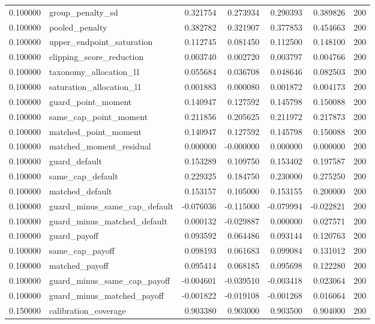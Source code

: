 \begin{tabular}{rlrrrrr}
0.100000 & group\_penalty\_sd & 0.321754 & 0.273934 & 0.290393 & 0.389826 & 200 \\
0.100000 & pooled\_penalty & 0.382782 & 0.321907 & 0.377853 & 0.454663 & 200 \\
0.100000 & upper\_endpoint\_saturation & 0.112745 & 0.081450 & 0.112500 & 0.148100 & 200 \\
0.100000 & clipping\_score\_reduction & 0.003740 & 0.002720 & 0.003797 & 0.004766 & 200 \\
0.100000 & taxonomy\_allocation\_l1 & 0.055684 & 0.036708 & 0.048646 & 0.082503 & 200 \\
0.100000 & saturation\_allocation\_l1 & 0.001883 & 0.000080 & 0.001872 & 0.004173 & 200 \\
0.100000 & guard\_point\_moment & 0.140947 & 0.127592 & 0.145798 & 0.150088 & 200 \\
0.100000 & same\_cap\_point\_moment & 0.211856 & 0.205625 & 0.211972 & 0.217873 & 200 \\
0.100000 & matched\_point\_moment & 0.140947 & 0.127592 & 0.145798 & 0.150088 & 200 \\
0.100000 & matched\_moment\_residual & 0.000000 & -0.000000 & 0.000000 & 0.000000 & 200 \\
0.100000 & guard\_default & 0.153289 & 0.109750 & 0.153402 & 0.197587 & 200 \\
0.100000 & same\_cap\_default & 0.229325 & 0.184750 & 0.230000 & 0.275250 & 200 \\
0.100000 & matched\_default & 0.153157 & 0.105000 & 0.153155 & 0.200000 & 200 \\
0.100000 & guard\_minus\_same\_cap\_default & -0.076036 & -0.115000 & -0.079994 & -0.022821 & 200 \\
0.100000 & guard\_minus\_matched\_default & 0.000132 & -0.029887 & 0.000000 & 0.027571 & 200 \\
0.100000 & guard\_payoff & 0.093592 & 0.064486 & 0.093144 & 0.120763 & 200 \\
0.100000 & same\_cap\_payoff & 0.098193 & 0.061683 & 0.099084 & 0.131012 & 200 \\
0.100000 & matched\_payoff & 0.095414 & 0.068185 & 0.095698 & 0.122280 & 200 \\
0.100000 & guard\_minus\_same\_cap\_payoff & -0.004601 & -0.039510 & -0.003418 & 0.023064 & 200 \\
0.100000 & guard\_minus\_matched\_payoff & -0.001822 & -0.019108 & -0.001268 & 0.016064 & 200 \\
0.150000 & calibration\_coverage & 0.903380 & 0.903000 & 0.903500 & 0.904000 & 200 \\

\end{tabular}
